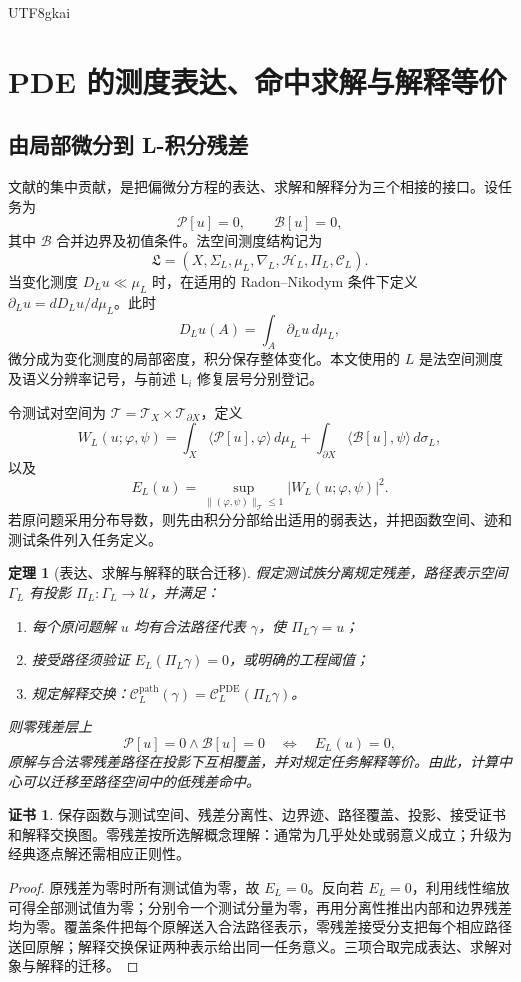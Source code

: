 \documentclass[11pt,a4paper]{article}
\theoremstyle{plain}
\newtheorem{theorem}{定理}[section]
\theoremstyle{definition}
\newtheorem*{certificate}{证书}
\theoremstyle{remark}
\begin{document}
\begin{CJK*}{UTF8}{gkai}
\section{PDE 的测度表达、命中求解与解释等价}
\label{ss:pde}

\subsection{由局部微分到 L-积分残差}

文献\cite{S36}的集中贡献，是把偏微分方程的表达、求解和解释分为三个相接的接口。设任务为
\[
 \mathcal P[u]=0,\qquad \mathcal B[u]=0,
\]
其中 $\mathcal B$ 合并边界及初值条件。法空间测度结构记为
\[
 \mathfrak L=(X,\Sigma_L,\mu_L,\nabla_L,\mathcal H_L,\Pi_L,\mathcal C_L).
\]
当变化测度 $D_Lu\ll\mu_L$ 时，在适用的 Radon--Nikodym 条件下定义 $\partial_Lu=dD_Lu/d\mu_L$。此时
\[
 D_Lu(A)=\int_A\partial_Lu\,d\mu_L,
\]
微分成为变化测度的局部密度，积分保存整体变化。本文使用的 $L$ 是法空间测度及语义分辨率记号，与前述 $\mathsf L_i$ 修复层号分别登记。

令测试对空间为 $\mathcal T=\mathcal T_X\times\mathcal T_{\partial X}$，定义
\[
 W_L(u;\varphi,\psi)
 =\int_X\langle\mathcal P[u],\varphi\rangle\,d\mu_L
 +\int_{\partial X}\langle\mathcal B[u],\psi\rangle\,d\sigma_L,
\]
以及
\[
 E_L(u)=\sup_{\|(\varphi,\psi)\|_{\mathcal T}\le1}
              |W_L(u;\varphi,\psi)|^2.
\]
若原问题采用分布导数，则先由积分分部给出适用的弱表达，并把函数空间、迹和测试条件列入任务定义。

\begin{theorem}[表达、求解与解释的联合迁移]
\label{ss:pde-equivalence}
假定测试族分离规定残差，路径表示空间 $\Gamma_L$ 有投影 $\Pi_L:\Gamma_L\to\mathcal U$，并满足：
\begin{enumerate}
 \item 每个原问题解 $u$ 均有合法路径代表 $\gamma$，使 $\Pi_L\gamma=u$；
 \item 接受路径须验证 $E_L(\Pi_L\gamma)=0$，或明确的工程阈值；
 \item 规定解释交换：$\mathcal C_L^{\mathrm{path}}(\gamma)=\mathcal C_L^{\mathrm{PDE}}(\Pi_L\gamma)$。
\end{enumerate}
则零残差层上
\[
 \mathcal P[u]=0\wedge\mathcal B[u]=0
 \quad\Longleftrightarrow\quad E_L(u)=0,
\]
原解与合法零残差路径在投影下互相覆盖，并对规定任务解释等价。由此，计算中心可以迁移至路径空间中的低残差命中。
\end{theorem}
\begin{certificate}
保存函数与测试空间、残差分离性、边界迹、路径覆盖、投影、接受证书和解释交换图。零残差按所选解概念理解：通常为几乎处处或弱意义成立；升级为经典逐点解还需相应正则性。
\end{certificate}
\begin{proof}
原残差为零时所有测试值为零，故 $E_L=0$。反向若 $E_L=0$，利用线性缩放可得全部测试值为零；分别令一个测试分量为零，再用分离性推出内部和边界残差均为零。覆盖条件把每个原解送入合法路径表示，零残差接受分支把每个相应路径送回原解；解释交换保证两种表示给出同一任务意义。三项合取完成表达、求解对象与解释的迁移。
\end{proof}


\end{CJK*}
\end{document}
